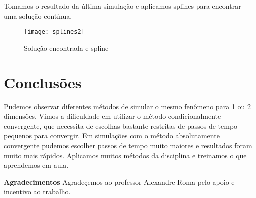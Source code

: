 \documentclass[12pt,fleqn]{article}
\begin{document}
Tomamos o resultado da última simulação e aplicamos splines para encontrar uma solução contínua.

\begin{figure}[H]
	\centering
		\texttt{[image: splines2]}
		\caption{Solução encontrada e spline}
\end{figure}

\section{Conclusões}
Pudemos observar diferentes métodos de simular o mesmo fenômeno para 1 ou 2 dimensões. Vimos a dificuldade em utilizar o método condicionalmente convergente, que necessita de escolhas bastante restritas de passos de tempo pequenos para convergir. Em simulações com o método absolutamente convergente pudemos escolher passos de tempo muito maiores e resultados foram muito mais rápidos. Aplicamos muitos métodos da disciplina e treinamos o que aprendemos em aula.

\vspace{5mm}
{\bf{Agradecimentos}} Agradeçemos ao professor Alexandre Roma pelo apoio e incentivo ao trabalho.



\end{document}
